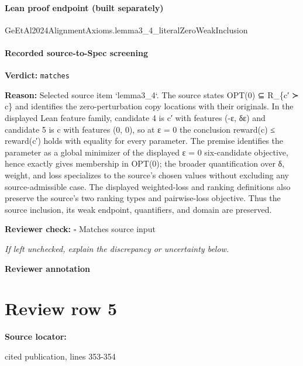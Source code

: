 \documentclass[10pt]{article}
\newcommand{\reviewerbox}{%
  \par\noindent\fbox{\parbox{0.96\linewidth}{\rule{0pt}{0.38in}}}\par
}
\newcommand{\reviewmatch}[1]{%
  \par\noindent\textbf{Reviewer check:} $\square$\; #1\par
  \noindent\emph{If left unchecked, explain the discrepancy or uncertainty below.}\par
}
\begin{document}
\paragraph{Lean proof endpoint (built separately)}\begin{ReviewVerbatim}
GeEtAl2024AlignmentAxioms.lemma3_4_literalZeroWeakInclusion
\end{ReviewVerbatim}

\paragraph{Recorded source-to-Spec screening}
\textbf{Verdict:} \texttt{matches}
\\
{\raggedright
\textbf{Reason:} Selected source item `lemma3\_\allowbreak{}4`.\allowbreak{} The source states OPT(0) ⊆ R\_\allowbreak{}\{c′ {≻} c\} and identifies the zero-\allowbreak{}perturbation copy locations with their originals.\allowbreak{} In the displayed Lean feature family, candidate 4 is c′ with features (-\allowbreak{}ε, δε) and candidate 5 is c with features (0, 0), so at ε = 0 the conclusion reward(c) ≤ reward(c′) holds with equality for every parameter.\allowbreak{} The premise identifies the parameter as a global minimizer of the displayed ε = 0 six-\allowbreak{}candidate objective, hence exactly gives membership in OPT(0);\allowbreak{} the broader quantification over δ, weight, and loss specializes to the source's chosen values without excluding any source-\allowbreak{}admissible case.\allowbreak{} The displayed weighted-\allowbreak{}loss and ranking definitions also preserve the source's two ranking types and pairwise-\allowbreak{}loss objective.\allowbreak{} Thus the source inclusion, its weak endpoint, quantifiers, and domain are preserved.\allowbreak{}
\par}
\reviewmatch{Matches source input}
\noindent\textbf{Reviewer annotation}\par
\reviewerbox
\clearpage
\hypertarget{source-claim-03ca4893d06d5c73}{}
\section*{Review row 5}
\textbf{Source locator:} {\footnotesize\raggedright cited publication, lines 353-\allowbreak{}354\par}
\end{document}

